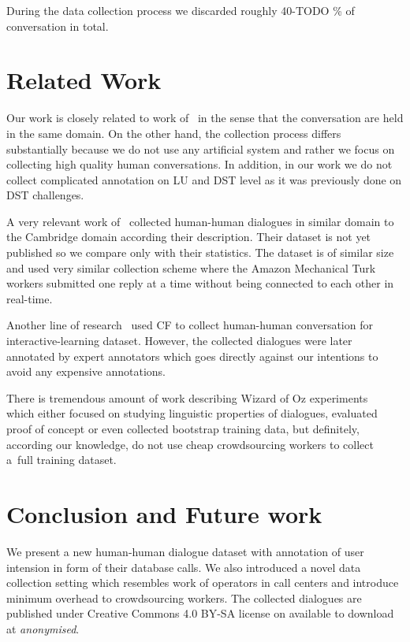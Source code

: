 \documentclass[runningheads,a4paper]{llncs}
\begin{document}
During the data collection process we discarded roughly 40-TODO \% of conversation in total.


\section{Related Work}
\label{sec:related}

Our work is closely related  to work of~\cite{dstc1, dstc2, dstc3} in the sense that the conversation are held in the same domain.
On the other hand, the collection process differs substantially because we do not use any artificial system and rather we focus on collecting high quality human conversations. In addition, in our work we do not collect complicated annotation on LU and DST level as it was previously done on DST challenges.

A very relevant work of~\cite{Wen} collected human-human dialogues in similar domain to the Cambridge domain according their description.
Their dataset is not yet published so we compare only with their statistics.
The dataset is of similar size and used very similar collection scheme where the Amazon Mechanical Turk workers submitted one reply at a time without being connected to each other in real-time.

Another line of research~\cite{mirek-interactive} used CF to collect human-human conversation for interactive-learning dataset.
However, the collected dialogues were later annotated by expert annotators which goes directly against our intentions to avoid any expensive annotations.

There is tremendous amount of work describing Wizard of Oz experiments~\cite{walker,schlangen,someone} which either focused on studying linguistic properties of dialogues, evaluated proof of concept or even collected bootstrap training data, but definitely, according our knowledge, do not use cheap crowdsourcing workers to collect a~full training dataset.

\section{Conclusion and Future work}
\label{sec:conc}
We present a new human-human dialogue dataset with annotation of user intension in form of their database calls.
We also introduced a novel data collection setting which resembles work of operators in call centers and introduce minimum overhead to crowdsourcing workers.
The collected dialogues are published under Creative Commons 4.0 BY-SA license on available to download at {\it anonymised}.  %
\end{document}
